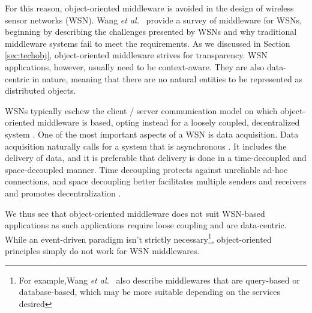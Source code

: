 \documentclass{acm_proc_article-sp}
\def\etal{{\it et al.\/}}
\begin{document}
For this reason, object-oriented middleware is avoided in the design of wireless sensor networks (WSN). Wang \etal\ \cite{Wang:2008p8370} provide a survey of middleware for WSNs, beginning by describing the challenges presented by WSNs and why traditional middleware systems fail to meet the requirements.  As we discussed in Section \ref{sec:techobj}, object-oriented middleware strives for transparency.  WSN applications, however, usually need to be context-aware.  They are also data-centric in nature, meaning that there are no natural entities to be represented as distributed objects.


WSNs typically eschew the client / server communication model on which object-oriented middleware is based, opting instead for a loosely coupled, decentralized system \cite{Meier:2002p8380}.  One of the most important aspects of a WSN is data acquisition.  Data acquisition naturally calls for a system that is asynchronous \cite{Wang:2008p8370}.  It includes the delivery of data, and it is preferable that delivery is done in a time-decoupled and space-decoupled manner. Time decoupling protects against unreliable ad-hoc connections, and space decoupling better facilitates multiple senders and receivers and promotes decentralization \cite{Meier:2002p8380}.

We thus see that object-oriented middleware does not suit WSN-based applications as such applications require loose coupling and are data-centric.  While an event-driven paradigm isn't strictly necessary\footnote{For example,Wang \etal\ \cite{Wang:2008p8370} also describe middlewares that are query-based or database-based, which may be more suitable depending on the services desired}, object-oriented principles simply do not work for WSN middlewares.




\end{document}
